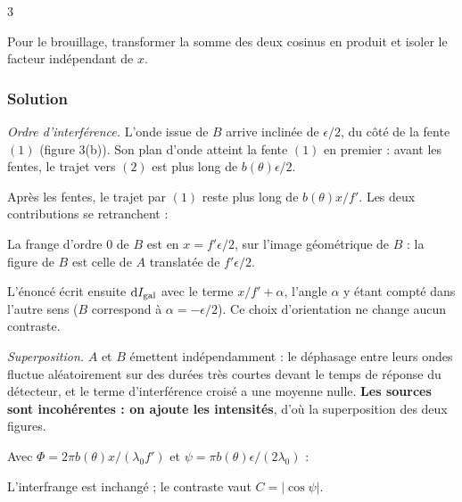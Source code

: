\documentclass[11pt,a4paper]{article}
\newcommand{\equationajustee}[1]{%
  \sbox{\boiteequation}{$\displaystyle #1$}%
  \ifdim\wd\boiteequation>\linewidth
    \[\resizebox{\linewidth}{!}{\usebox{\boiteequation}}\]%
  \else
    \[#1\]%
  \fi}
\begin{document}
\begin{indication}{3}

Pour le brouillage, transformer la somme des deux cosinus en produit et isoler le facteur indépendant de \(x\).

\end{indication}

\hypertarget{solution-7}{%
\subsubsection{Solution}\label{solution-7}}

\emph{Ordre d'interférence.} L'onde issue de \(B\) arrive inclinée de \(\epsilon/2\), du côté de la fente \((1)\) (figure 3(b)). Son plan d'onde atteint la fente \((1)\) en premier : avant les fentes, le trajet vers \((2)\) est plus long de \(b(\theta)\epsilon/2\).

Après les fentes, le trajet par \((1)\) reste plus long de \(b(\theta)x/f'\). Les deux contributions se retranchent :

\equationajustee{\boxed{p_B(x)=\frac{b(\theta)}{\lambda_0}\left(\frac{x}{f'}-\frac{\epsilon}{2}\right)}}

La frange d'ordre 0 de \(B\) est en \(x=f'\epsilon/2\), sur l'image géométrique de \(B\) : la figure de \(B\) est celle de \(A\) translatée de \(f'\epsilon/2\).

L'énoncé écrit ensuite \(\mathrm dI_{\rm gal}\) avec le terme \(x/f'+\alpha\), l'angle \(\alpha\) y étant compté dans l'autre sens (\(B\) correspond à \(\alpha=-\epsilon/2\)). Ce choix d'orientation ne change aucun contraste.

\emph{Superposition.} \(A\) et \(B\) émettent indépendamment : le déphasage entre leurs ondes fluctue aléatoirement sur des durées très courtes devant le temps de réponse du détecteur, et le terme d'interférence croisé a une moyenne nulle. \textbf{Les sources sont incohérentes : on ajoute les intensités}, d'où la superposition des deux figures.

Avec \(\Phi=2\pi b(\theta)x/(\lambda_0f')\) et \(\psi=\pi b(\theta)\epsilon/(2\lambda_0)\) :

\equationajustee{\begin{aligned}
I&=2I_0\left[2+\cos\Phi+\cos(\Phi-2\psi)\right]\\
&=4I_0\left[1+\cos\psi\,\cos(\Phi-\psi)\right]
\end{aligned}}

L'interfrange est inchangé ; le contraste vaut \(C=\left|\cos\psi\right|\).
\end{document}
